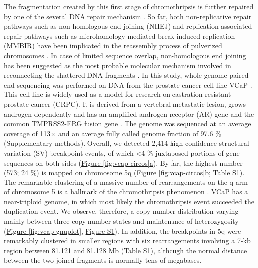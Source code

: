 The fragmentation created by this first stage of chromothripsis is further repaired by one of the several DNA repair mechanism \cite{holland2012chromoanagenesis}.
So far, both non-replicative repair pathways such as non-homologous end joining (NHEJ) and replication-associated repair pathways such as microhomology-mediated
break-induced replication (MMBIR) have been implicated in the reassembly process of pulverized chromosomes \cite{forment2012chromothripsis}. In case of limited sequence
overlap, non-homologous end joining has been suggested as the most probable molecular mechanism involved in reconnecting the shattered DNA fragments
\cite{rausch2012genome}.
In this study, whole genome paired-end sequencing was performed on DNA from the prostate cancer cell line VCaP \cite{drmanac2010human}. This cell line is widely
used as a model for research on castration-resistant prostate cancer (CRPC). It is derived from a vertebral metastatic lesion, grows androgen dependently and
has an amplified androgen receptor (AR) gene and the common TMPRSS2-ERG fusion gene \cite{korenchuk2001vcap}. The genome was sequenced at an average coverage
of 113× and an average fully called genome fraction of 97.6 \% (Supplementary methods). Overall, we detected 2,414 high confidence structural variation (SV)
breakpoint events, of which <4 \% juxtaposed portions of gene sequences on both sides (\hyperref[fig:vcap-circos]{Figure \ref*{fig:vcap-circos}a}). By far, the highest number (573; 24 \%) is
 mapped on chromosome 5q (\hyperref[fig:vcap-circos]{Figure \ref*{fig:vcap-circos}b}; \href{https://link.springer.com/article/10.1007/s00439-013-1308-1#SupplementaryMaterial}{Table S1}). The remarkable clustering of a massive number of rearrangements on the q arm of chromosome 5 is
a hallmark of the chromothripsis phenomenon \cite{forment2012chromothripsis}. VCaP has a near-triploid genome, in which most likely the chromothripsis event succeeded
the duplication event. We observe, therefore, a copy number distribution varying mainly between three copy number states and maintenance of heterozygosity
(\hyperref[vcap-gnuplot]{Figure \ref*{fig:vcap-gnuplot}}, \href{https://link.springer.com/article/10.1007/s00439-013-1308-1#SupplementaryMaterial}{Figure S1}). In addition, the breakpoints in 5q were remarkably clustered in smaller regions with six rearrangements involving a 7-kb
region between 81.121 and 81.128 Mb (\href{https://link.springer.com/article/10.1007/s00439-013-1308-1#SupplementaryMaterial}{Table S1}), although the normal distance between the two joined fragments is normally tens of megabases.

